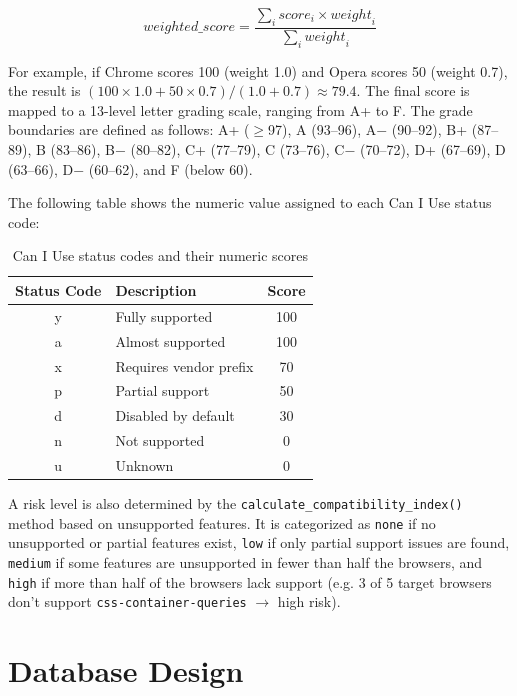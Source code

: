 \[
\mathit{weighted\_score} = \frac{\sum_i \mathit{score}_i \times \mathit{weight}_i}{\sum_i \mathit{weight}_i}
\]

For example, if Chrome scores 100 (weight 1.0) and Opera scores 50 (weight 0.7), the result is $(100 \times 1.0 + 50 \times 0.7) / (1.0 + 0.7) \approx 79.4$. The final score is mapped to a 13-level letter grading scale, ranging from A+ to F. The grade boundaries are defined as follows: A+ ($\geq$97), A (93--96), A$-$ (90--92), B+ (87--89), B (83--86), B$-$ (80--82), C+ (77--79), C (73--76), C$-$ (70--72), D+ (67--69), D (63--66), D$-$ (60--62), and F (below 60).

The following table shows the numeric value assigned to each Can I Use status code:

\begin{table}[H]
    \centering
    \begin{tabular}{|c|l|c|}
        \hline
        \textbf{Status Code} & \textbf{Description} & \textbf{Score} \\
        \hline \hline
        y & Fully supported & 100 \\
        \hline
        a & Almost supported & 100 \\
        \hline
        x & Requires vendor prefix & 70 \\
        \hline
        p & Partial support & 50 \\
        \hline
        d & Disabled by default & 30 \\
        \hline
        n & Not supported & 0 \\
        \hline
        u & Unknown & 0 \\
        \hline
    \end{tabular}
    \caption{Can I Use status codes and their numeric scores}
    \label{tab:status-scores}
\end{table}

A risk level is also determined by the \texttt{calculate\_compatibility\_index()} method based on unsupported features. It is categorized as \texttt{none} if no unsupported or partial features exist, \texttt{low} if only partial support issues are found, \texttt{medium} if some features are unsupported in fewer than half the browsers, and \texttt{high} if more than half of the browsers lack support (e.g. 3 of 5 target browsers don't support \texttt{css-container-queries} $\to$ high risk).

\section{Database Design}
\label{sec:database}

